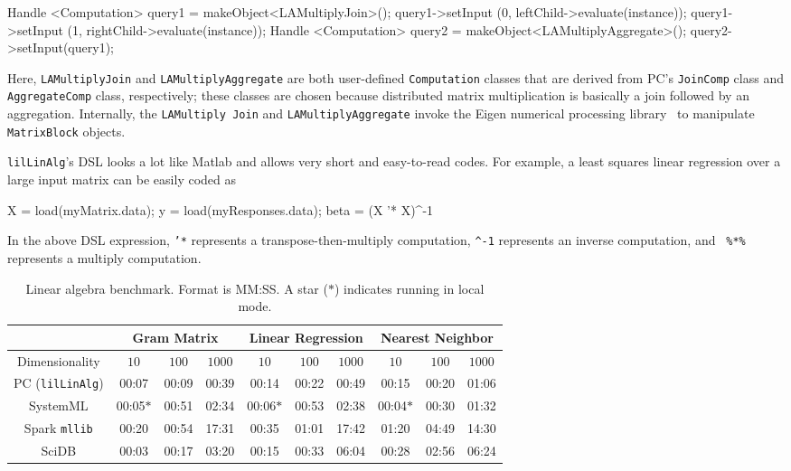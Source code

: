 \begin{codesmall}
Handle <Computation> query1 = makeObject<LAMultiplyJoin>();
query1->setInput (0, leftChild->evaluate(instance));
query1->setInput (1, rightChild->evaluate(instance));
Handle <Computation> query2 = 
  makeObject<LAMultiplyAggregate>();
query2->setInput(query1);
\end{codesmall}

\noindent Here, \texttt{LAMultiplyJoin} and \texttt{LAMultiplyAggregate} are 
both user-defined \texttt{Computation} classes that are
derived from PC's \texttt{JoinComp} class and \texttt{AggregateComp} class, respectively; these classes are chosen 
because distributed matrix multiplication
is basically a join followed by an aggregation.
Internally, the \texttt{LAMultiply Join}
and \texttt{LAMultiplyAggregate} invoke the Eigen numerical processing
library~\cite{eigen} to manipulate \texttt{MatrixBlock} objects.

\texttt{lilLinAlg}'s DSL looks a lot like Matlab and allows very short and easy-to-read codes.
For example, 
a least squares linear regression over a large input matrix can be easily coded as

\begin{codesmall}
X = load(myMatrix.data); 
y = load(myResponses.data); 
beta = (X '* X)^-1 %
\end{codesmall}

\noindent In the above DSL expression, \texttt{'*} represents a transpose-then-multiply computation,
\texttt{\^{}-1} represents an inverse computation, and \texttt{ \%*\%}
represents a multiply computation. 

\begin{table}[h]
\small
\begin{center}
\begin{tabular}{|c||c|c|c||c|c|c||c|c|c|}
\hline
& \multicolumn{3}{c||}{Gram Matrix} & \multicolumn{3}{c||}{Linear Regression} & \multicolumn{3}{c|}{Nearest Neighbor} \\
\hline
Dimensionality & $10$ & $100$ & $1000$& $10$ & $100$ & $1000$& $10$ & $100$ & $1000$ \\
\hline
\hline
PC (\texttt{lilLinAlg}) &00:07 & 00:09 &00:39 &00:14 &00:22 &00:49& 00:15 & 00:20 & 01:06 \\
SystemML &00:05$*$ &00:51 &02:34 &00:06$*$ &00:53 &02:38 &00:04$*$ &00:30 &01:32 \\
Spark \texttt{mllib} &00:20  &00:54 &17:31 &00:35 &01:01 &17:42 &01:20 & 04:49 &14:30 \\
SciDB   &00:03 &00:17 &03:20 &00:15 &00:33 &06:04 &00:28 &02:56 & 06:24 \\
\hline
\end{tabular}
\caption{Linear algebra benchmark. Format is MM:SS.
A star ($*$) indicates running in local mode.}
\label{fig:LR}
\end{center}
\vspace{-20pt}
\end{table}

